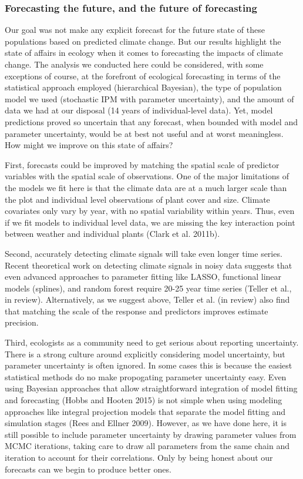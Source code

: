 \documentclass[12pt,]{article}
\begin{document}
\subsubsection{Forecasting the future, and the future of
forecasting}\label{forecasting-the-future-and-the-future-of-forecasting}

Our goal was not make any explicit forecast for the future state of
these populations based on predicted climate change. But our results
highlight the state of affairs in ecology when it comes to forecasting
the impacts of climate change. The analysis we conducted here could be
considered, with some exceptions of course, at the forefront of
ecological forecasting in terms of the statistical approach employed
(hierarchical Bayesian), the type of population model we used
(stochastic IPM with parameter uncertainty), and the amount of data we
had at our disposal (14 years of individual-level data). Yet, model
predictions proved so uncertain that any forecast, when bounded with
model and parameter uncertainty, would be at best not useful and at
worst meaningless. How might we improve on this state of affairs?

First, forecasts could be improved by matching the spatial scale of
predictor variables with the spatial scale of observations. One of the
major limitations of the models we fit here is that the climate data are
at a much larger scale than the plot and individual level observations
of plant cover and size. Climate covariates only vary by year, with no
spatial variability within years. Thus, even if we fit models to
individual level data, we are missing the key interaction point between
weather and individual plants (Clark et al. 2011b).

Second, accurately detecting climate signals will take even longer time
series. Recent theoretical work on detecting climate signals in noisy
data suggests that even advanced approaches to parameter fitting like
LASSO, functional linear models (splines), and random forest require
20-25 year time series (Teller et al., in review). Alternatively, as we
suggest above, Teller et al. (in review) also find that matching the
scale of the response and predictors improves estimate precision.

Third, ecologists as a community need to get serious about reporting
uncertainty. There is a strong culture around explicitly considering
model uncertainty, but parameter uncertainty is often ignored. In some
cases this is because the easiest statistical methods do no make
propogating parameter uncertainty easy. Even using Bayesian approaches
that allow straightforward integration of model fitting and forecasting
(Hobbs and Hooten 2015) is not simple when using modeling approaches
like integral projection models that separate the model fitting and
simulation stages (Rees and Ellner 2009). However, as we have done here,
it is still possible to include parameter uncertainty by drawing
parameter values from MCMC iterations, taking care to draw all
parameters from the same chain and iteration to account for their
correlations. Only by being honest about our forecasts can we begin to
produce better ones.
\end{document}
